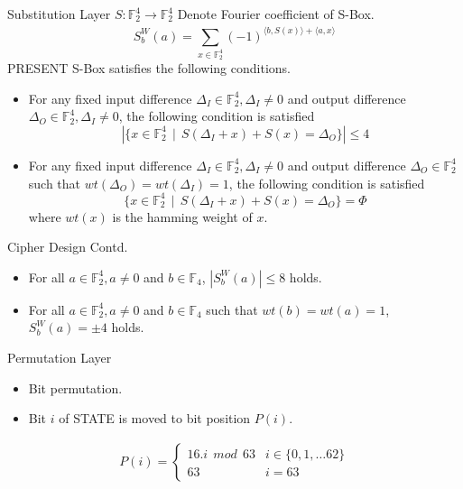 \begin{frame}{Substitution Layer $S:\mathbb{F}_2^4\xrightarrow[]{}\mathbb{F}_2^4$}
    Denote Fourier coefficient of S-Box. 
    \begin{equation}
        S_b^W (a) = \sum_{x \in \mathbb{F}_2^4} (-1)^{\langle b,S(x)\rangle + \langle a,x\rangle}
    \end{equation}
     PRESENT S-Box satisfies the following conditions.
    \begin{itemize}
        \item For any fixed input difference $\Delta_I \in \mathbb{F}_2^4,\Delta_I \not = 0$ and output difference $\Delta_O \in \mathbb{F}_2^4,\Delta_I \not = 0$, the following condition is satisfied
        \begin{equation*}
            |\{ x \in \mathbb{F}_2^4~~ \vert~~ S(\Delta_I +x) + S(x) = \Delta_O \}| \leq 4
        \end{equation*}
        \item For any fixed input difference $\Delta_I \in \mathbb{F}_2^4,\Delta_I \not = 0$ and output difference $\Delta_O \in \mathbb{F}_2^4$ such that $wt(\Delta_O) = wt(\Delta_I) = 1$, the following condition is satisfied
        \begin{equation*}
            \{ x \in \mathbb{F}_2^4~~ \vert~~  S(\Delta_I +x) + S(x) = \Delta_O  \} = \Phi
        \end{equation*}
        where $wt(x)$ is the hamming weight of $x$.
    \end{itemize}
\end{frame}
\begin{frame}{Cipher Design Contd.}
    \begin{itemize}
        \item For all $a \in \mathbb{F}_2^4, a \not = 0 $ and $b \in \mathbb{F}_4$, $|S_b^W (a)| \leq 8$ holds.
        \item For all $a \in \mathbb{F}_2^4, a \not = 0 $ and $b \in \mathbb{F}_4$ such that $wt(b) = wt(a) = 1$, $S_b^W (a) = \pm 4 $ holds.
    \end{itemize}
    \begin{block}{Permutation Layer}
        \begin{itemize}
            \item Bit permutation.
            \item Bit $i$ of \textsc{STATE} is moved to bit position $P(i)$.
        \end{itemize}
        \begin{eqnarray*}
         P(i) =  \begin{cases} 
              16.i~~ mod~~ 63 & i \in \{0,1,\dots 62 \}\\
              63 & i = 63 
           \end{cases}
        \end{eqnarray*}
    \end{block}
\end{frame}
